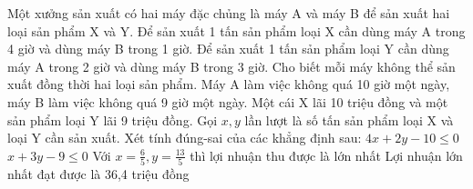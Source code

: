 \begin{ex}
 Một xưởng sản xuất có hai máy đặc chủng là máy A và máy B để sản xuất hai loại sản phẩm X và Y. Để sản xuất 1 tấn sản phẩm loại X cần dùng máy A trong 4 giờ và dùng máy B trong 1 giờ. Để sản xuất 1 tấn sản phẩm loại Y cần dùng máy A trong 2 giờ và dùng máy B trong 3 giờ. Cho biết mỗi máy không thể sản xuất đồng thời hai loại sản phẩm. Máy A làm việc không quá 10 giờ một ngày, máy B làm việc không quá 9 giờ một ngày. Một cái X lãi 10 triệu đồng và một sản phẩm loại Y lãi 9 triệu đồng. Gọi ${x,y}$ lần lượt là số tấn sản phẩm loại X và loại Y cần sản xuất. Xét tính đúng-sai của các khẳng định sau:
\choiceTFt
{ \True  $4 x + 2 y - 10 \le 0$ }
   { \True  $x + 3 y - 9 \le 0$ }
     { \True  Với $x = \frac{6}{5}, y = \frac{13}{5}$ thì lợi nhuận thu được là lớn nhất }
    { Lợi nhuận lớn nhất đạt được là 36,4 triệu đồng  }
\end{ex}

